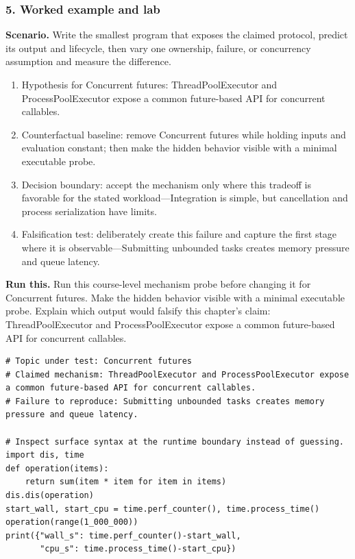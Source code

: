 \subsubsection*{5. Worked example and lab}
\textbf{Scenario.} Write the smallest program that exposes the claimed protocol, predict its output and lifecycle, then vary one ownership, failure, or concurrency assumption and measure the difference.
\begin{enumerate}
\item Hypothesis for Concurrent futures: ThreadPoolExecutor and ProcessPoolExecutor expose a common future-based API for concurrent callables.
\item Counterfactual baseline: remove Concurrent futures while holding inputs and evaluation constant; then make the hidden behavior visible with a minimal executable probe.
\item Decision boundary: accept the mechanism only where this tradeoff is favorable for the stated workload—Integration is simple, but cancellation and process serialization have limits.
\item Falsification test: deliberately create this failure and capture the first stage where it is observable—Submitting unbounded tasks creates memory pressure and queue latency.
\end{enumerate}
\textbf{Run this.} Run this course-level mechanism probe before changing it for Concurrent futures. Make the hidden behavior visible with a minimal executable probe. Explain which output would falsify this chapter's claim: ThreadPoolExecutor and ProcessPoolExecutor expose a common future-based API for concurrent callables.
\begin{Verbatim}[fontsize=\scriptsize]
# Topic under test: Concurrent futures
# Claimed mechanism: ThreadPoolExecutor and ProcessPoolExecutor expose a common future-based API for concurrent callables.
# Failure to reproduce: Submitting unbounded tasks creates memory pressure and queue latency.

# Inspect surface syntax at the runtime boundary instead of guessing.
import dis, time
def operation(items):
    return sum(item * item for item in items)
dis.dis(operation)
start_wall, start_cpu = time.perf_counter(), time.process_time()
operation(range(1_000_000))
print({"wall_s": time.perf_counter()-start_wall,
       "cpu_s": time.process_time()-start_cpu})
\end{Verbatim}
